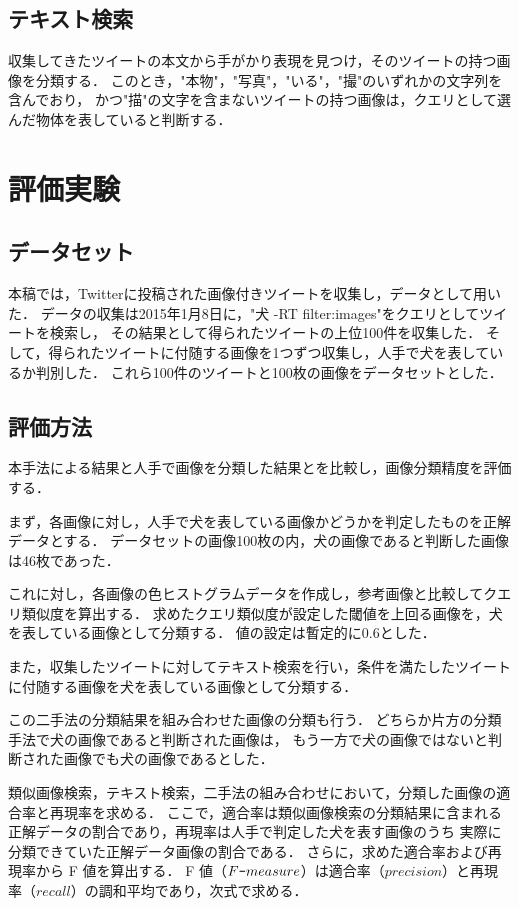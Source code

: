 \section{テキスト検索}
収集してきたツイートの本文から手がかり表現を見つけ，そのツイートの持つ画像を分類する．
このとき，"本物"，"写真"，"いる"，"撮"のいずれかの文字列を含んでおり，
かつ"描"の文字を含まないツイートの持つ画像は，クエリとして選んだ物体を表していると判断する．

\chapter{評価実験}
\label{sec:experiment}
\section{データセット}
本稿では，Twitterに投稿された画像付きツイートを収集し，データとして用いた．
データの収集は2015年1月8日に，"犬 -RT filter:images"をクエリとしてツイートを検索し，
その結果として得られたツイートの上位100件を収集した．
そして，得られたツイートに付随する画像を1つずつ収集し，人手で犬を表しているか判別した．
これら100件のツイートと100枚の画像をデータセットとした．

\section{評価方法}
本手法による結果と人手で画像を分類した結果とを比較し，画像分類精度を評価する．

まず，各画像に対し，人手で犬を表している画像かどうかを判定したものを正解データとする．
データセットの画像100枚の内，犬の画像であると判断した画像は46枚であった．

これに対し，各画像の色ヒストグラムデータを作成し，参考画像と比較してクエリ類似度を算出する．
求めたクエリ類似度が設定した閾値を上回る画像を，犬を表している画像として分類する．
値の設定は暫定的に0.6とした．

また，収集したツイートに対してテキスト検索を行い，条件を満たしたツイートに付随する画像を犬を表している画像として分類する．

この二手法の分類結果を組み合わせた画像の分類も行う．
どちらか片方の分類手法で犬の画像であると判断された画像は，
もう一方で犬の画像ではないと判断された画像でも犬の画像であるとした．

類似画像検索，テキスト検索，二手法の組み合わせにおいて，分類した画像の適合率と再現率を求める．
ここで，適合率は類似画像検索の分類結果に含まれる正解データの割合であり，再現率は人手で判定した犬を表す画像のうち
実際に分類できていた正解データ画像の割合である．
さらに，求めた適合率および再現率から F 値を算出する．
F 値（$F\verb|-|measure$）は適合率（$precision$）と再現率（$recall$）の調和平均であり，次式で求める．

